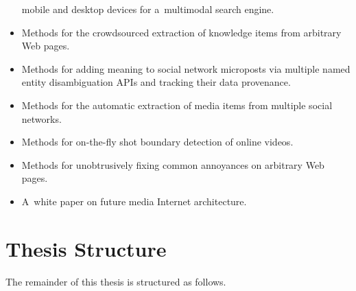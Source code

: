 \begin{itemize}
        mobile and desktop devices for a~multimodal search engine.
  \item Methods for the crowdsourced extraction of knowledge items
        from arbitrary Web pages.
  \item Methods for adding meaning to social network microposts
        via multiple named entity disambiguation APIs and
        tracking their data provenance.
  \item Methods for the automatic extraction of media items from
        multiple social networks.
  \item Methods for on-the-fly shot boundary detection of
        online videos.
   \item Methods for unobtrusively fixing common annoyances on
         arbitrary Web pages.
   \item A~white paper on future media Internet architecture.
\end{itemize}

\section{Thesis Structure}
The remainder of this thesis is structured as follows. 
